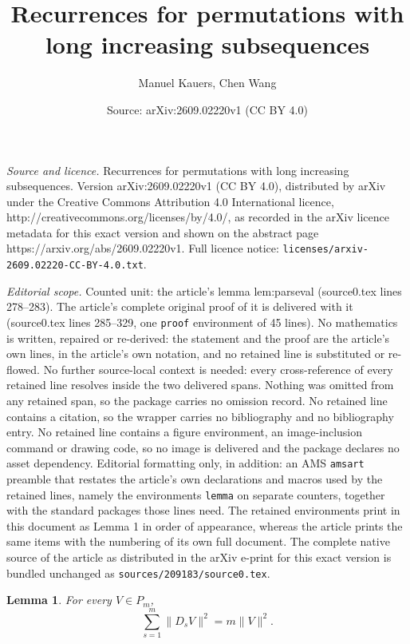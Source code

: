 \documentclass[10pt,a4paper]{amsart}
\title{Recurrences for permutations with long increasing subsequences}
\author{Manuel Kauers, Chen Wang}
\date{Source: arXiv:2609.02220v1 (CC BY 4.0)}
\newtheorem{lemma}{Lemma}
\begin{document}
\maketitle

\noindent\emph{Source and licence.} Recurrences for permutations with long increasing subsequences. Version arXiv:2609.02220v1 (CC BY 4.0), distributed by arXiv under the Creative Commons Attribution 4.0 International licence, http://creativecommons.org/licenses/by/4.0/, as recorded in the arXiv licence metadata for this exact version and shown on the abstract page https://arxiv.org/abs/2609.02220v1. Full licence notice: \texttt{licenses/arxiv-2609.02220-CC-BY-4.0.txt}.\par\smallskip

\noindent\textit{Editorial scope.} Counted unit: the article's lemma lem:parseval (source0.tex lines 278--283). The article's complete original proof of it is delivered with it (source0.tex lines 285--329, one \texttt{proof} environment of 45 lines). No mathematics is written, repaired or re-derived: the statement and the proof are the article's own lines, in the article's own notation, and no retained line is substituted or re-flowed.  No further source-local context is needed: every cross-reference of every retained line resolves inside the two delivered spans.  Nothing was omitted from any retained span, so the package carries no omission record.  No retained line contains a citation, so the wrapper carries no bibliography and no bibliography entry.  No retained line contains a figure environment, an image-inclusion command or drawing code, so no image is delivered and the package declares no asset dependency.  Editorial formatting only, in addition: an AMS \texttt{amsart} preamble that restates the article's own declarations and macros used by the retained lines, namely the environments \texttt{lemma} on separate counters, together with the standard packages those lines need.  The retained environments print in this document as Lemma 1 in order of appearance, whereas the article prints the same items with the numbering of its own full document.  The complete native source of the article as distributed in the arXiv e-print for this exact version is bundled unchanged as \texttt{sources/209183/source0.tex}.
\begin{lemma}\label{lem:parseval}
For every $V\in P_m$,
\begin{equation}\label{eq:parseval}
    \sum_{s=1}^m\|D_sV\|^2=m\|V\|^2.
\end{equation}
\end{lemma}
\end{document}

